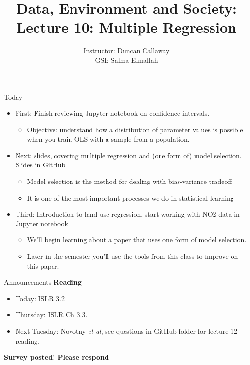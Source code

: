 \documentclass[aspectratio=169, handout]{beamer}
\title[Lecture 10: Multiple Regression] %
{Data, Environment and Society: \\{Lecture 10: Multiple Regression}}
\author[ER131: Data, Environment and Society] 
{Instructor: Duncan Callaway\\
GSI: Salma Elmallah}
\institute[UC Berkeley] %
 {\small{ \bf October 1, 2019}}
\date[October 1, 2019]
\begin{document}
\begin{frame}
  \titlepage
\end{frame}

\begin{frame}{Today}

\begin{itemize}
\item First: Finish reviewing Jupyter notebook on confidence intervals.
\begin{itemize}
  \item Objective: understand how a distribution of parameter values is possible when you train OLS with a sample from a population.  
\end{itemize}
\item Next: slides, covering multiple regression and (one form of) model selection.  Slides in GitHub
\begin{itemize}
  \item Model selection is the method for dealing with bias-variance tradeoff
  \item It is one of the most important processes we do in statistical learning  
\end{itemize}
\item Third: Introduction to land use regression, start working with NO2 data in Jupyter notebook
\begin{itemize}
  \item We'll begin learning about a paper that uses one form of model selection.
  \item Later in the semester you'll use the tools from this class to improve on this paper.
\end{itemize}
\end{itemize}

\end{frame}

\begin{frame}{Announcements}
\textbf{Reading}
\begin{itemize}
\item Today: ISLR 3.2
\item Thursday: ISLR Ch 3.3.
\item Next Tuesday: Novotny \textit{et al}, see questions in GitHub folder for lecture 12 reading.
\end{itemize}

\textbf{Survey posted!  Please respond}
\end{frame}
\end{document}
